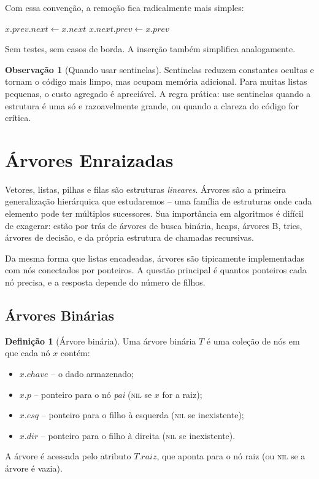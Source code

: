 \documentclass[9pt,a4paper]{extarticle}
\newcommand{\impt}[1]{\textcolor{important}{#1}}
\newcommand{\ntc}[1]{\textcolor{notice}{#1}}
\theoremstyle{definition}
\newtheorem{definition}{Definição}[section]
\newtheorem{remark}{Observação}[section]
\begin{document}
Com essa convenção, a remoção fica radicalmente mais simples:

\begin{algorithm}[H]
\caption{\textsc{Lista-Remove'}($L, x$) -- versão com sentinela}
\begin{algorithmic}[1]
\State $x.\mathit{prev}.\mathit{next} \gets x.\mathit{next}$
\State $x.\mathit{next}.\mathit{prev} \gets x.\mathit{prev}$
\end{algorithmic}
\end{algorithm}

Sem testes, sem casos de borda. A inserção também simplifica analogamente.

\begin{remark}[Quando usar sentinelas]
Sentinelas reduzem constantes ocultas e tornam o código mais limpo, mas \ntc{ocupam memória adicional}. Para muitas listas pequenas, o custo agregado é apreciável. A regra prática: use sentinelas quando a estrutura é uma só e razoavelmente grande, ou quando a clareza do código for crítica.
\end{remark}

\section{Árvores Enraizadas}

Vetores, listas, pilhas e filas são estruturas \emph{lineares}. \impt{Árvores} são a primeira generalização hierárquica que estudaremos -- uma família de estruturas onde cada elemento pode ter múltiplos sucessores. Sua importância em algoritmos é difícil de exagerar: estão por trás de árvores de busca binária, heaps, árvores B, tries, árvores de decisão, e da própria estrutura de chamadas recursivas.

Da mesma forma que listas encadeadas, árvores são tipicamente implementadas com \impt{nós conectados por ponteiros}. A questão principal é \ntc{quantos ponteiros cada nó precisa}, e a resposta depende do número de filhos.

\subsection{Árvores Binárias}

\begin{definition}[Árvore binária]
Uma árvore binária $T$ é uma coleção de nós em que cada nó $x$ contém:
\begin{itemize}
    \item $x.\mathit{chave}$ -- o dado armazenado;
    \item $x.p$ -- ponteiro para o nó \emph{pai} (\textsc{nil} se $x$ for a raiz);
    \item $x.\mathit{esq}$ -- ponteiro para o filho à esquerda (\textsc{nil} se inexistente);
    \item $x.\mathit{dir}$ -- ponteiro para o filho à direita (\textsc{nil} se inexistente).
\end{itemize}
A árvore é acessada pelo atributo $T.\mathit{raiz}$, que aponta para o nó raiz (ou \textsc{nil} se a árvore é vazia).
\end{definition}
\end{document}
